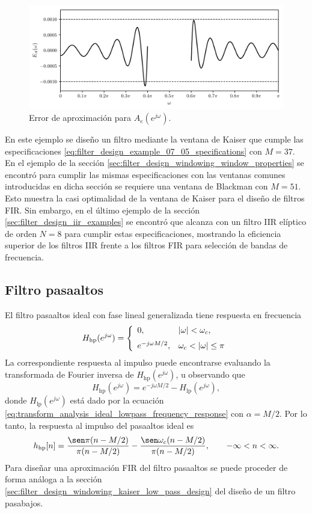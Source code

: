 \documentclass[a4paper]{report}
\begin{document}
\begin{figure}[!htb]
 \begin{center}
 \includegraphics[width=1\textwidth]{figuras/filter_design_example_07_05_with_kaiser_aprox_error.pdf}
 \caption{\label{fig:filter_design_example_07_05_with_kaiser_aprox_error} Error de aproximación para \(A_e(e^{j\omega})\).}
 \end{center}
\end{figure}

En este ejemplo se diseño un filtro mediante la ventana de Kaiser que cumple las especificaciones \ref{eq:filter_design_example_07_05_specifications} con \(M=37\). En el ejemplo de la sección \ref{sec:filter_design_windowing_window_properties} se encontró para cumplir las mismas especificaciones con las ventanas comunes introducidas en dicha sección se requiere una ventana de Blackman con \(M=51\). Esto muestra la casi optimalidad de la ventana de Kaiser para el diseño de filtros FIR. Sin embargo, en el último ejemplo de la sección \ref{sec:filter_design_iir_examples} se encontró que alcanza con un filtro IIR elíptico de orden \(N=8\) para cumplir estas especificaciones, mostrando la eficiencia superior de los filtros IIR frente a los filtros FIR para selección de bandas de frecuencia.

\subsection{Filtro pasaaltos}

El filtro pasaaltos ideal con fase lineal generalizada tiene respuesta en frecuencia
\[
 H_\textrm{hp}(e^{j\omega})=
 \left\{
 \begin{array}{ll}
  0,                  &|\omega|<\omega_c,\\[\medskipamount]
  e^{-j\omega M/2}, &\omega_c<|\omega|\leq\pi\\
 \end{array}
 \right. 
\]
La correspondiente respuesta al impulso puede encontrarse evaluando la transformada de Fourier inversa de \(H_\textrm{hp}(e^{j\omega})\), u observando que
\[
 H_\textrm{hp}(e^{j\omega})=e^{-j\omega M/2}-H_\textrm{lp}(e^{j\omega}),
\]
donde \(H_\textrm{lp}(e^{j\omega})\) está dado por la ecuación \ref{eq:transform_analysis_ideal_lowpass_frequency_response} con \(\alpha=M/2\). Por lo tanto, la respuesta al impulso del pasaaltos ideal es
\[
 h_\textrm{hp}[n]=\frac{\sen\pi(n-M/2)}{\pi(n-M/2)}-\frac{\sen\omega_c(n-M/2)}{\pi(n-M/2)},
 \qquad
 -\infty<n<\infty.
\]
Para diseñar una aproximación FIR del filtro pasaaltos se puede proceder de forma análoga a la sección \ref{sec:filter_design_windowing_kaiser_low_pass_design} del diseño de un filtro pasabajos.
\end{document}

